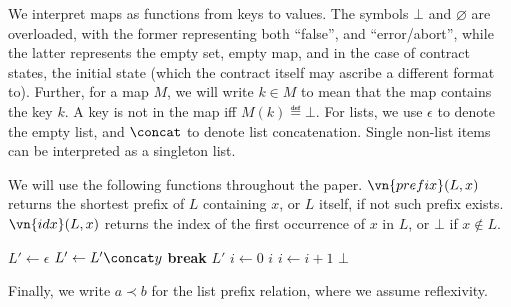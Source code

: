We interpret maps as functions from keys to values. The symbols $\bot$ and
$\varnothing$ are overloaded, with the former representing both
``false'', and ``error/abort'', while the latter represents the empty set, empty
map, and in the case of contract states, the initial state (which the contract
itself may ascribe a different format to). Further, for a map $M$, we will write
$k \in M$ to mean that the map contains the key $k$. A key is not in the map iff
$M(k) \eqdef \bot$. For lists, we use $\epsilon$ to denote the empty list, and
$\concat$ to denote list concatenation. Single non-list items can be interpreted
as a singleton list.

We will use the following functions throughout the paper. $\vn{prefix}(L, x)$
returns the shortest prefix of $L$ containing $x$, or $L$ itself, if not such
prefix exists. $\vn{idx}(L, x)$ returns the index of the first occurrence of $x$
in $L$, or $\bot$ if $x \notin L$.

\begin{algorithmic}
    \State \Let $L' \gets \epsilon$
      \State $L' \gets L' \concat y$
        \textbf{break}
      \EndIf
    \EndFor
    \State \Return $L'$
  \EndFunction
    \State \Let $i \gets 0$
        \Return $i$
      \EndIf
      \State \Let $i \gets i + 1$
    \EndFor
    \State \Return $\bot$
  \EndFunction
\end{algorithmic}

\noindent
Finally, we write $a \prec b$ for the list prefix relation, where we assume
reflexivity.


